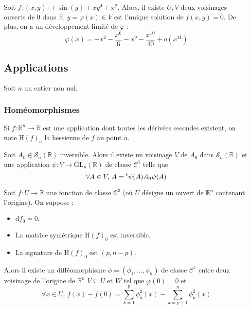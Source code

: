	
	\begin{example}
		Soit $f : (x,y) \mapsto \sin(y) + xy^4 + x^2$. Alors, il existe $U, V$ deux voisinages ouverts de $0$ dans $\mathbb{R}$, $y = \varphi(x) \in V$ est l'unique solution de $f(x,y) = 0$. De plus, on a un développement limité de $\varphi$ :
		\[ \varphi(x) = -x^2 - \frac{x^6}{6} - x^9 - \frac{x^{10}}{40} + o(x^{11}) \]
	\end{example}
	
	\subsection{Applications}
	
	Soit $n$ un entier non nul.
	
	\subsubsection{Homéomorphismes}
	
	
	\begin{notation}
		Si $f : \mathbb{R}^n \rightarrow \mathbb{R}$ est une application dont toutes les dérivées secondes existent, on note $\mathrm{H}(f)_a$ la hessienne de $f$ au point $a$.
	\end{notation}
	
	\begin{lemma}
		Soit $A_0 \in \mathcal{S}_n(\mathbb{R})$ inversible. Alors il existe un voisinage $V$ de $A_0$ dans $\mathcal{S}_n(\mathbb{R})$ et une application $\psi : V \rightarrow \mathrm{GL}_n(\mathbb{R})$ de classe $\mathcal{C}^1$ telle que
		\[ \forall A \in V, \, A = \mathstrut ^t \psi(A) A_0 \psi(A) \]
	\end{lemma}
	
	
	\begin{lemma}[Morse]
		Soit $f : U \rightarrow \mathbb{R}$ une fonction de classe $\mathcal{C}^3$ (où $U$ désigne un ouvert de $\mathbb{R}^n$ contenant l'origine). On suppose :
		\begin{itemize}
			\item $\mathrm{d} f_0 = 0$.
			\item La matrice symétrique $\mathrm{H} (f)_0$ est inversible.
			\item La signature de $\mathrm{H}(f)_0$ est $(p, n-p)$.
		\end{itemize}
		Alors il existe un difféomorphisme $\phi = (\phi_1, \dots, \phi_n)$ de classe $\mathcal{C}^1$ entre deux voisinage de l'origine de $\mathbb{R}^n$ $V \subseteq U$ et $W$ tel que $\varphi(0) = 0$ et
		\[ \forall x \in U, \, f(x) - f(0) = \sum_{k=1}^p \phi_k^2(x) - \sum_{k=p+1}^n \phi_k^2(x) \]
	\end{lemma}
	
